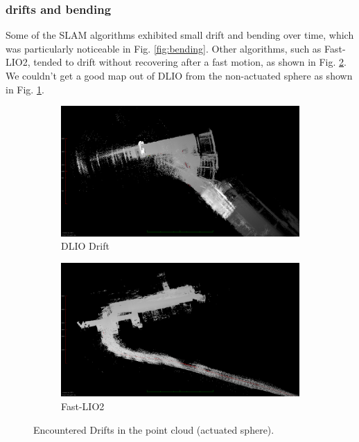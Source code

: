 \documentclass[conference]{IEEEtran}
\begin{document}
\subsubsection{drifts and bending}
Some of the SLAM algorithms exhibited small drift and bending over time, which was particularly noticeable in Fig. \ref{fig:bending}. Other algorithms, such as Fast-LIO2, tended to drift without recovering after a fast motion, as shown in Fig. \ref{fig:lio_drift}. We couldn't get a good map out of DLIO from the non-actuated sphere as shown in Fig. \ref{fig:dlio_drift}.
\begin{figure}
\centering
\begin{subfigure}{0.42\columnwidth}
    \centering
    \includegraphics[width=\textwidth]{pics/drifts_bending/dlio_drift.png}
    \caption{DLIO Drift}\label{fig:dlio_drift}
    \end{subfigure}
\hfill
\begin{subfigure}{0.41\columnwidth}
    \centering
    \includegraphics[width=\textwidth]{pics/drifts_bending/lio_drifts.png}
    \caption{Fast-LIO2}\label{fig:lio_drift}
\end{subfigure}
\hfill
\caption{Encountered Drifts in the point cloud (actuated sphere).}
\label{fig:drift}
\end{figure}
\end{document}
